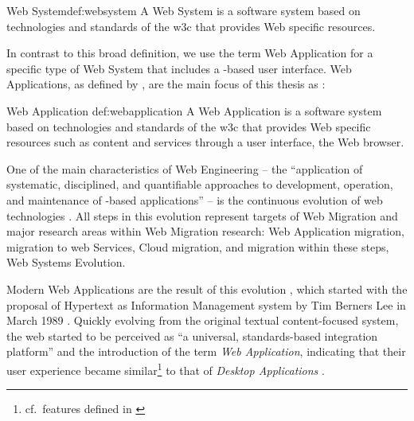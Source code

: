 \vspace{-15pt}
\begin{thesisdefinition}{Web System}{def:websystem}
A Web System is a software system based on technologies and standards of the \gls{w3c} that provides Web specific resources.
\end{thesisdefinition}

\vspace{-5pt}
In contrast to this broad definition, we use the term \gls{Web Application} for a specific type of \gls{Web System} that includes a -based user interface. \glspl{Web Application}, as defined by \citeauthor{Kappel2006WebEngineering}, are the main focus of this thesis as :

\vspace{-15pt}
\begin{thesisdefinition}{Web Application \autocite{Kappel2006WebEngineering}}{def:webapplication}
A Web Application is a software system based on technologies and standards of the \gls{w3c} that provides Web specific resources such as content and services through a user interface, the Web browser.
\end{thesisdefinition}


\vspace{-5pt}
One of the main characteristics of \gls{Web Engineering} -- the ``application of systematic, disciplined, and quantifiable approaches to development, operation, and maintenance of -based applications'' \autocite{Deshpande2002WebEngineering} -- is the continuous evolution of \Gls{web} technologies \autocite{Gitzel2007WebEngineeringMDD}.
All steps in this evolution represent targets of \gls{Web Migration} and major research areas within \gls{Web Migration} research: \gls{Web Application} migration, migration to \Gls{web} Services, Cloud migration, and migration within these steps, \gls{Web Systems Evolution}.

Modern \glspl{Web Application} are the result of this evolution \autocite{Kienle2014EvolutionWeb}, which started with the proposal of Hypertext as Information Management system by Tim Berners Lee in March 1989 \autocite{Berners-Lee1989}.
Quickly evolving from the original textual content-focused system, the \Gls{web} started to be perceived as ``a universal, standards-based integration platform'' \autocite{Knorr2003WebAsPlatform} and the introduction of the term \emph{\gls{Web Application}}, indicating that their user experience became similar\footnote{cf.~features defined in \autocite{Rodriguez-Echeverria2012MIGRARIA}} to that of \emph{\glspl{Desktop Application}} \autocite{Kienle2014EvolutionWeb}.

